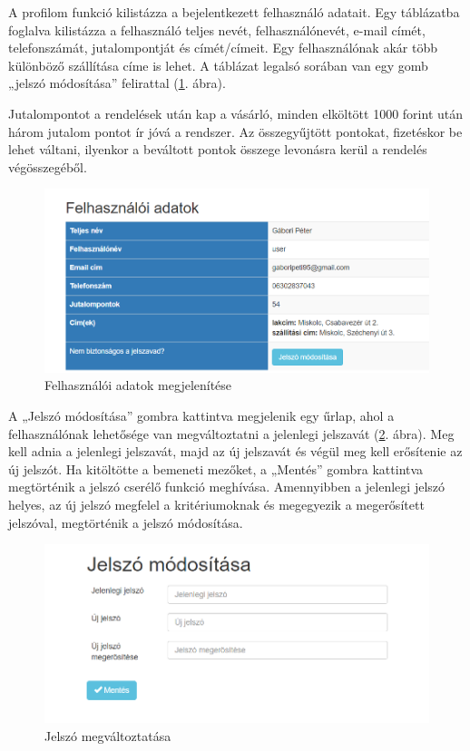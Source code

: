 
A profilom funkció kilistázza a bejelentkezett felhasználó adatait. Egy táblázatba foglalva kilistázza a felhasználó teljes nevét, felhasználónevét, e-mail címét, telefonszámát, jutalompontját és címét/címeit. Egy felhasználónak akár több különböző szállítása címe is lehet. A táblázat legalsó sorában van egy gomb „jelszó módosítása” felirattal (\ref{fig:profile}. ábra).

Jutalompontot a rendelések után kap a vásárló, minden elköltött 1000 forint után három jutalom pontot ír jóvá a rendszer. Az összegyűjtött pontokat, fizetéskor be lehet váltani, ilyenkor a beváltott pontok összege levonásra kerül a rendelés végösszegéből.

\begin{figure}
\centering
\includegraphics[scale=0.6]{kepek/profile.png}
\caption{Felhasználói adatok megjelenítése}
\label{fig:profile}
\end{figure}

A „Jelszó módosítása” gombra kattintva megjelenik egy űrlap, ahol a felhasználónak lehetősége van megváltoztatni a jelenlegi jelszavát (\ref{fig:password}. ábra). Meg kell adnia a jelenlegi jelszavát, majd az új jelszavát és végül meg kell erősítenie az új jelszót. Ha kitöltötte a bemeneti mezőket, a „Mentés” gombra kattintva megtörténik a jelszó cserélő funkció meghívása. Amennyibben a jelenlegi jelszó helyes, az új jelszó megfelel a kritériumoknak és megegyezik a megerősített jelszóval, megtörténik a jelszó módosítása.

\begin{figure}
\centering
\includegraphics[scale=0.8]{kepek/password.png}
\caption{Jelszó megváltoztatása}
\label{fig:password}
\end{figure}

